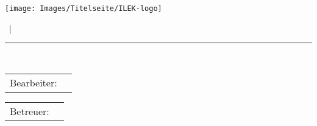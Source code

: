 \begin{titlepage}
	\begin{minipage}[t]{60mm}
		\begin{flushleft}
			\hspace{2.0pt}\texttt{[image: Images/Titelseite/ILEK-logo]}
		\end{flushleft}
	\end{minipage}
	\begin{minipage}[t]{70mm}
		\begin{flushleft}
			{\fontsize{14}{20}\sffamily{\arbeit}}
		\end{flushleft}	
	\end{minipage}
	\begin{minipage}[t]{33mm}
		\begin{flushright}
			{\fontsize{14}{20}\sffamily{\Nummer}~|~\textsf{\EndeJahr}}
		\end{flushright}
	\end{minipage}
	\begin{center} 
		\vspace{-16.0pt}\nointerlineskip\rule{\textwidth}{0.4pt}\\ 
		\vspace{2.0pt}\nointerlineskip
	\end{center}
	
	\vspace{10mm}
	\hspace{60mm}
	\begin{minipage}[c]{105mm}
		\begin{minipage}[t][4cm][c]{\textwidth}
			\LARGE{\textsf{\titel}}
		\end{minipage}
		\hspace{0mm} 
		
		\vspace{5mm}
		\hspace{-3.0mm} 
		\begin{tabular}{p{2.5cm}l}
			\fontsize{12}{20}\textsf{Bearbeiter:}&\textsf{\student} \\
		\end{tabular}
		
		\vspace{5mm}
		\hspace{-3.0mm} 
		\begin{tabular}{p{2.5cm}l}
			\fontsize{12}{20}\textsf{Betreuer:}&\textsf{\bereuer} \\ 
		\end{tabular}
		

\end{minipage}
\end{titlepage}

